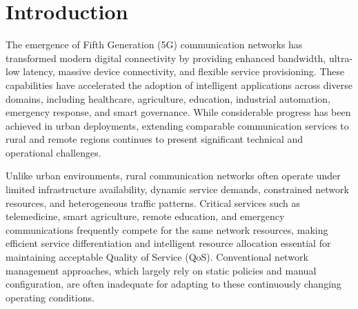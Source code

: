 \documentclass[12pt,a4paper]{report}
\begin{document}
	\clearpage
	
	
	
	\clearpage
	
	\tableofcontents
	\clearpage
	
	
	\listoffigures
	\clearpage
	
	
	\listoftables
	\clearpage
	
	
	\setcounter{page}{1}
	
	\chapter{Introduction}
	\label{chap:introduction}
	
	The emergence of Fifth Generation (5G) communication networks has transformed modern digital connectivity by providing enhanced bandwidth, ultra-low latency, massive device connectivity, and flexible service provisioning. These capabilities have accelerated the adoption of intelligent applications across diverse domains, including healthcare, agriculture, education, industrial automation, emergency response, and smart governance. While considerable progress has been achieved in urban deployments, extending comparable communication services to rural and remote regions continues to present significant technical and operational challenges.
	
	Unlike urban environments, rural communication networks often operate under limited infrastructure availability, dynamic service demands, constrained network resources, and heterogeneous traffic patterns. Critical services such as telemedicine, smart agriculture, remote education, and emergency communications frequently compete for the same network resources, making efficient service differentiation and intelligent resource allocation essential for maintaining acceptable Quality of Service (QoS). Conventional network management approaches, which largely rely on static policies and manual configuration, are often inadequate for adapting to these continuously changing operating conditions.
	
\end{document}
